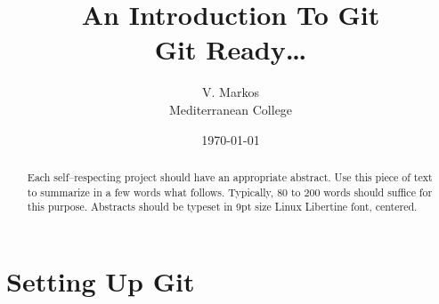 \documentclass[a4paper, 11pt]{article}
\title{An Introduction To Git\\{\normalsize Git Ready\ldots}}
\author{V. Markos\\{\normalsize Mediterranean College}}
\date{\today}
\numberwithin{equation}{section}
\theoremstyle{definition}
\begin{document}
	\maketitle
	\begin{abstract}
		Each self--respecting project should have an appropriate abstract. Use this piece of text to summarize in a few words what follows. Typically, 80 to 200 words should suffice for this purpose. Abstracts should be typeset in 9pt size Linux Libertine font, centered.
	\end{abstract}

	\section{Setting Up Git}\label{sec:Setting Up Git}
	
\end{document}
